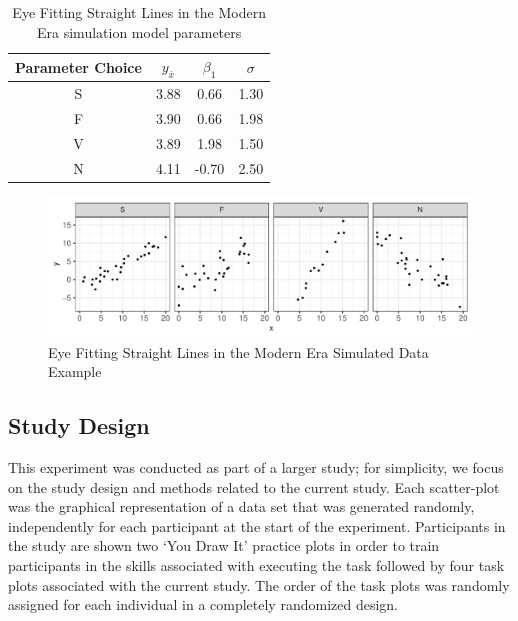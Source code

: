 \documentclass[12pt]{article}
\begin{document}
\begin{table}

\caption{\label{tab:eyefitting-parameters}Eye Fitting Straight Lines in the Modern Era simulation model parameters}
\centering
\begin{tabular}[t]{cccc}
\toprule
Parameter Choice & $y_{\bar{x}}$ & $\beta_1$ & $\sigma$\\
\midrule
S & 3.88 & 0.66 & 1.30\\
F & 3.90 & 0.66 & 1.98\\
V & 3.89 & 1.98 & 1.50\\
N & 4.11 & -0.70 & 2.50\\
\bottomrule
\end{tabular}
\end{table}

\begin{figure}[tbp]

{\centering \includegraphics[width=1\linewidth,]{Eye-Fitting-Stright-Lines-in-the-Modern-Era_files/figure-latex/eyefitting-simplot-1} 

}

\caption{Eye Fitting Straight Lines in the Modern Era Simulated Data Example}\label{fig:eyefitting-simplot}
\end{figure}

\hypertarget{study-design}{%
\subsection{Study Design}\label{study-design}}

This experiment was conducted as part of a larger study; for simplicity,
we focus on the study design and methods related to the current study.
Each scatter-plot was the graphical representation of a data set that
was generated randomly, independently for each participant at the start
of the experiment. Participants in the study are shown two `You Draw It'
practice plots in order to train participants in the skills associated
with executing the task followed by four task plots associated with the
current study. The order of the task plots was randomly assigned for
each individual in a completely randomized design.
\end{document}
